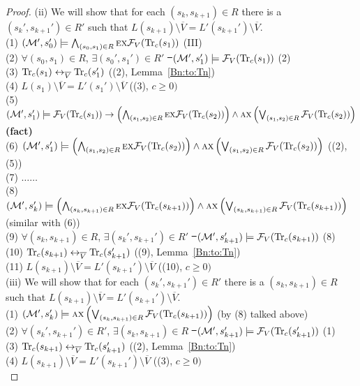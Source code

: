 \documentclass{article}
\begin{document}
\begin{proof}
        (ii) We will show that for each $(s_k, s_{k+1}) \in R$ there is a $(s_k', s_{k+1}') \in R'$ such that $L(s_{k+1}) \setminus \overline V = L'(s_{k+1}') \setminus \overline V$.\\
        (1) $({\cal M}', s_0') \models \bigwedge_{(s_0, s_1) \in R} \textsc{e} \textsc{x} {\cal F}_V(\textrm{Tr}_c(s_1))$  \hfill  (III)\\
        (2) $\forall (s_0, s_1) \in R$, $\exists (s_0', s_1') \in R'$ \st\ $({\cal M}', s_1') \models {\cal F}_V(\textrm{Tr}_c(s_1))$  \hfill  (2)\\
        (3) $\textrm{Tr}_c(s_1) \leftrightarrow_{\overline V} \textrm{Tr}_c(s_1')$  \hfill  ((2), Lemma~\ref{Bn:to:Tn}) \\
        (4) $L(s_1) \setminus \overline V = L'(s_1') \setminus \overline V$  \hfill   ((3), $c \geq 0)$\\
        (5) $({\cal M}', s_1') \models {\cal F}_V(\textrm{Tr}_c(s_1)) \rightarrow \left(\bigwedge_{(s_1,s_2)\in R} \textsc{e} \textsc{x} {\cal F}_V(\textrm{Tr}_c(s_2))\right) \wedge \textsc{a} \textsc{x} \left(\bigvee_{(s_1,s_2)\in R} {\cal F}_V(\textrm{Tr}_c(s_2))\right)$     \hfill  \textbf{(fact)}\\
        (6) $({\cal M}', s_1') \models \left(\bigwedge_{(s_1,s_2)\in R} \textsc{e} \textsc{x} {\cal F}_V(\textrm{Tr}_c(s_2))\right) \wedge \textsc{a} \textsc{x} \left(\bigvee_{(s_1,s_2)\in R} {\cal F}_V(\textrm{Tr}_c(s_2))\right)$ \hfill ((2), (5))\\
        (7) $\dots \dots$ \\
        (8) $({\cal M}', s_k') \models \left(\bigwedge_{(s_k,s_{k+1})\in R} \textsc{e} \textsc{x} {\cal F}_V(\textrm{Tr}_c(s_{k+1}))\right) \wedge \textsc{a} \textsc{x} \left(\bigvee_{(s_k,s_{k+1})\in R} {\cal F}_V(\textrm{Tr}_c(s_{k+1}))\right)$       \hfill (similar with (6))\\
        (9) $\forall (s_k, s_{k+1}) \in R$, $\exists (s_k', s_{k+1}') \in R'$ \st\ $({\cal M}', s_{k+1}') \models {\cal F}_V(\textrm{Tr}_c(s_{k+1}))$  \hfill  (8)\\
        (10) $\textrm{Tr}_c(s_{k+1}) \leftrightarrow_{\overline V} \textrm{Tr}_c(s_{k+1}')$    \hfill ((9), Lemma~\ref{Bn:to:Tn}) \\
        (11) $L(s_{k+1}) \setminus \overline V = L'(s_{k+1}') \setminus \overline V$  \hfill   ((10), $c \geq 0)$\\

        (iii) We will show that for each $(s_k', s_{k+1}') \in R'$ there is a $(s_k, s_{k+1})\in R$ such that $L(s_{k+1}) \setminus \overline V = L'(s_{k+1}') \setminus \overline V$.\\
        (1) $({\cal M}', s_k') \models \textsc{a} \textsc{x} \left(\bigvee_{(s_k,s_{k+1})\in R} {\cal F}_V(\textrm{Tr}_c(s_{k+1}))\right)$  \hfill (by (8) talked above)\\
        (2) $\forall (s_k', s_{k+1}') \in R'$, $\exists (s_k, s_{k+1}) \in R$ \st\ $({\cal M}', s_{k+1}') \models {\cal F}_V(\textrm{Tr}_c(s_{k+1}'))$  \hfill (1) \\
        (3) $\textrm{Tr}_c(s_{k+1}) \leftrightarrow_{\overline V} \textrm{Tr}_c(s_{k+1}')$    \hfill ((2), Lemma~\ref{Bn:to:Tn}) \\
        (4) $L(s_{k+1}) \setminus \overline V = L'(s_{k+1}') \setminus \overline V$  \hfill   ((3), $c \geq 0)$\\


\end{proof}
\end{document}
